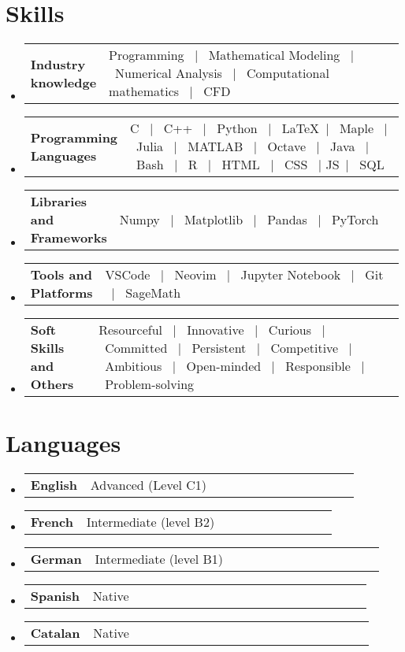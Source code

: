 \documentclass[a4paper,11pt]{article}
\makeatletter
\newcommand{\resumeSectionTypeOne}[2]{
  \item\begin{tabular*}{0.99\textwidth}[t]{
    p{0.18\linewidth}p{0.81\linewidth}
  }
  \textbf{#1} & #2
  \end{tabular*}\vspace{-2pt}
}
\newcommand{\resumeQuadHeading}[4]{
  \item
  \begin{tabular*}{0.96\textwidth}[t]{l@{\extracolsep{\fill}}r}
    \textbf{#1} & \small #2 \\
    \small#3 & \small #4 \\
  \end{tabular*}
}
\newcommand{\resumeHeadingListStart}{
  \begin{itemize}[leftmargin=0.15in, label={}]
}
\newcommand{\resumeHeadingListEnd}{\end{itemize}}
\makeatother
\begin{document}





\section{Skills}
\resumeHeadingListStart{}
\resumeSectionTypeOne{Industry\hspace{1cm} knowledge}{Programming \ $|$ \ Mathematical Modeling \ $|$ \ Numerical Analysis \ $|$ \ Computational mathematics  \ $|$ \ CFD}
\resumeHeadingListEnd{}

\resumeHeadingListStart{}
\resumeSectionTypeOne{Programming Languages}{C \ $|$ \ C++ \ $|$ \ Python \ $|$ \ \LaTeX \ $|$ \ Maple \ $|$ \ Julia \ $|$ \ MATLAB \ $|$ \ Octave \ $|$ \ Java \ $|$ \ Bash \ $|$ \ R \ $|$ \ HTML \ $|$ \ CSS \ $|$ JS\ $|$ \ SQL}
\resumeHeadingListEnd{}

\resumeHeadingListStart{}
\resumeSectionTypeOne{Libraries and Frameworks}{Numpy \ $|$ \ Matplotlib \ $|$ \ Pandas \ $|$ \ PyTorch}
\resumeHeadingListEnd{}

\resumeHeadingListStart{}
\resumeSectionTypeOne{Tools and\hspace{0.5cm} Platforms}{VSCode \ $|$ \ Neovim  \ $|$ \ Jupyter Notebook \ $|$ \ Git \ $|$ \ SageMath}
\resumeHeadingListEnd{}

\resumeHeadingListStart{}
\resumeSectionTypeOne{Soft Skills and Others}{Resourceful \ $|$ \ Innovative \ $|$ \ Curious \ $|$ \ Committed \ $|$ \ Persistent \ $|$ \ Competitive \ $|$ \ Ambitious \ $|$ \ Open-minded \ $|$ \ Responsible \ $|$ \ Problem-solving}
\resumeHeadingListEnd{}

\section{Languages}
\resumeHeadingListStart{}
\resumeSectionTypeOne{English}{Advanced (Level C1)}
\resumeSectionTypeOne{French}{Intermediate (level B2)}
\resumeSectionTypeOne{German}{Intermediate (level B1)}
\resumeSectionTypeOne{Spanish}{Native}
\resumeSectionTypeOne{Catalan}{Native}
\resumeHeadingListEnd{}
\end{document}
